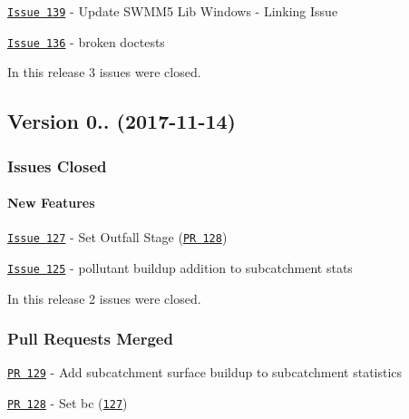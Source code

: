 \begin{DoxyItemize}
\item \href{https://github.com/OpenWaterAnalytics/pyswmm/issues/139}{\tt Issue 139} -\/ Update S\+W\+M\+M5 Lib Windows -\/ Linking Issue
\item \href{https://github.com/OpenWaterAnalytics/pyswmm/issues/136}{\tt Issue 136} -\/ broken doctests
\end{DoxyItemize}

In this release 3 issues were closed.

\subsection*{Version 0.. (2017-\/11-\/14)}

\subsubsection*{Issues Closed}

\paragraph*{New Features}


\begin{DoxyItemize}
\item \href{https://github.com/OpenWaterAnalytics/pyswmm/issues/127}{\tt Issue 127} -\/ Set Outfall Stage (\href{https://github.com/OpenWaterAnalytics/pyswmm/pull/128}{\tt PR 128})
\item \href{https://github.com/OpenWaterAnalytics/pyswmm/issues/125}{\tt Issue 125} -\/ pollutant buildup addition to subcatchment stats
\end{DoxyItemize}

In this release 2 issues were closed.

\subsubsection*{Pull Requests Merged}


\begin{DoxyItemize}
\item \href{https://github.com/OpenWaterAnalytics/pyswmm/pull/129}{\tt PR 129} -\/ Add subcatchment surface buildup to subcatchment statistics
\item \href{https://github.com/OpenWaterAnalytics/pyswmm/pull/128}{\tt PR 128} -\/ Set bc (\href{https://github.com/OpenWaterAnalytics/pyswmm/issues/127}{\tt 127})
\end{DoxyItemize}

